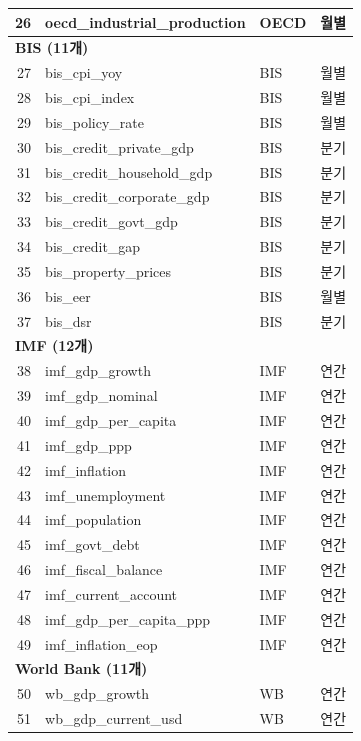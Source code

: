 \documentclass[11pt,a4paper]{article}
\begin{document}
\begin{longtable}{r l l l}
26 & oecd\_industrial\_production & OECD & 월별 \\
\midrule
\multicolumn{4}{l}{\textbf{BIS (11개)}} \\
\midrule
27 & bis\_cpi\_yoy                & BIS & 월별 \\
28 & bis\_cpi\_index              & BIS & 월별 \\
29 & bis\_policy\_rate            & BIS & 월별 \\
30 & bis\_credit\_private\_gdp    & BIS & 분기 \\
31 & bis\_credit\_household\_gdp  & BIS & 분기 \\
32 & bis\_credit\_corporate\_gdp  & BIS & 분기 \\
33 & bis\_credit\_govt\_gdp       & BIS & 분기 \\
34 & bis\_credit\_gap             & BIS & 분기 \\
35 & bis\_property\_prices        & BIS & 분기 \\
36 & bis\_eer                     & BIS & 월별 \\
37 & bis\_dsr                     & BIS & 분기 \\
\midrule
\multicolumn{4}{l}{\textbf{IMF (12개)}} \\
\midrule
38 & imf\_gdp\_growth             & IMF & 연간 \\
39 & imf\_gdp\_nominal            & IMF & 연간 \\
40 & imf\_gdp\_per\_capita        & IMF & 연간 \\
41 & imf\_gdp\_ppp                & IMF & 연간 \\
42 & imf\_inflation               & IMF & 연간 \\
43 & imf\_unemployment            & IMF & 연간 \\
44 & imf\_population              & IMF & 연간 \\
45 & imf\_govt\_debt              & IMF & 연간 \\
46 & imf\_fiscal\_balance         & IMF & 연간 \\
47 & imf\_current\_account        & IMF & 연간 \\
48 & imf\_gdp\_per\_capita\_ppp   & IMF & 연간 \\
49 & imf\_inflation\_eop          & IMF & 연간 \\
\midrule
\multicolumn{4}{l}{\textbf{World Bank (11개)}} \\
\midrule
50 & wb\_gdp\_growth              & WB & 연간 \\
51 & wb\_gdp\_current\_usd        & WB & 연간 \\

\end{longtable}
\end{document}
